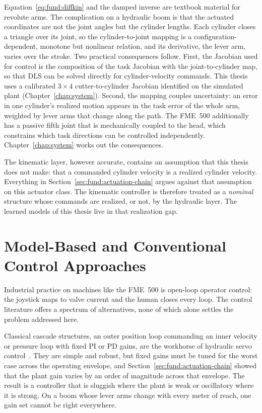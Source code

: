 Equation~\eqref{eq:fund:diffkin} and the damped inverse are textbook
material for revolute arms. The complication on a hydraulic boom is that
the actuated coordinates are not the joint angles but the cylinder
lengths. Each cylinder closes a triangle over its joint, so the
cylinder-to-joint mapping is a configuration-dependent, monotone but
nonlinear relation, and its derivative, the lever arm, varies over the
stroke. Two practical consequences follow. First, the Jacobian used for control is the composition of the task Jacobian with the
joint-to-cylinder map, so that DLS can be solved directly for
cylinder-velocity commands. This thesis uses a calibrated $3{\times}4$
cutter-to-cylinder Jacobian identified on the simulated plant
(Chapter~\ref{chap:system}). Second, the mapping couples uncertainty: an
error in one cylinder's realized motion appears in the task error of the
whole arm, weighted by lever arms that change along the path. The FME~500
additionally has a passive fifth joint that is mechanically coupled to
the head, which constrains which task directions can be controlled
independently. Chapter~\ref{chap:system} works out the consequences.

The kinematic layer, however accurate, contains an assumption that this thesis does not make: that a commanded cylinder velocity is
a realized cylinder velocity. Everything in
Section~\ref{sec:fund:actuation-chain} argues against that assumption on
this actuator class. The kinematic controller is therefore treated as a
\emph{nominal} structure whose commands are realized, or not, by the
hydraulic layer. The learned models of this thesis live in that
realization gap.

\section{Model-Based and Conventional Control Approaches}
\label{sec:fund:conventional-control}

Industrial practice on machines like the FME~500 is open-loop operator
control: the joystick maps to valve current and the human closes every
loop. The control literature offers a spectrum of alternatives, none of which
alone settles the problem addressed here.

Classical cascade structures, an outer position loop commanding an inner
velocity or pressure loop with fixed PI or PD gains, are the workhorse of
hydraulic servo control~\cite{jelali2003hydraulic}. They are simple and
robust, but fixed gains must be tuned for the worst case across the
operating envelope, and Section~\ref{sec:fund:actuation-chain} showed
that the plant gain varies by an order of magnitude across that
envelope. The result is a controller that is sluggish where the plant is
weak or oscillatory where it is strong. On a boom whose lever arms change
with every meter of reach, one gain set cannot be right everywhere.

